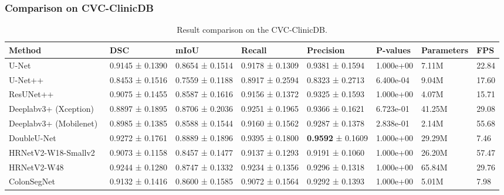 \documentclass[journal,twoside,web]{IEEEtran}
\begin{document}
\subsubsection{Comparison on CVC-ClinicDB}
\begin{table*}[!t]
\centering
\footnotesize
\caption{Result comparison on the CVC-ClinicDB.}
\label{tab:result2}
\begin{tabular}{@{}l|l|l|l|l|l|l|l@{}}
\toprule
\textbf{Method} &\textbf{DSC}   &\textbf{mIoU} &\textbf{Recall} &\textbf{Precision}& \textbf{P-values} & \textbf{Parameters} & \textbf{FPS} \\
\hline
\hline


U-Net~\cite{ronneberger2015u}  & 0.9145 ± 0.1390 & 0.8654 ± 0.1514 &0.9178 ± 0.1309 &0.9381 ± 0.1594 & 1.000e+00 & 7.11M & 22.84    \\ \hline

U-Net++~\cite{zhou2019unet++} & 0.8453 ± 0.1516 & 0.7559 ± 0.1188 & 0.8917 ± 0.2594 & 0.8323 ± 0.2713 & 6.400e-04 & 9.04M & 17.60 \\ \hline

ResUNet++~\cite{jha2019resunet++} & 0.9075 ± 0.1455 & 0.8587 ± 0.1616 & 0.9156 ± 0.1372 & 0.9325 ± 0.1593 & 1.000e+00 & 4.07M & 15.71 \\ \hline

Deeplabv3+ (Xception)~\cite{chen2018encoder} & 0.8897 ± 0.1895 & 0.8706 ± 0.2036 & 0.9251 ± 0.1965 & 0.9366 ± 0.1621 & 6.723e-01 & 41.25M & 29.08 \\\hline

Deeplabv3+ (Mobilenet)~\cite{chen2018encoder} & 0.8985 ± 0.1385 & 0.8588 ± 0.1544 & 0.9160 ± 0.1562 & 0.9287 ± 0.1378 & 2.838e-01 & 2.14M & 55.68 \\ \hline

DoubleU-Net~\cite{jha2020doubleu} & 0.9272 ± 0.1761 & 0.8889 ± 0.1896 & 0.9395 ± 0.1800 & \textbf{0.9592} ± 0.1609 & 1.000e+00 & 29.29M & 7.46 \\ \hline

HRNetV2-W18-Smallv2~\cite{Wang_2020} & 0.9073 ± 0.1158 & 0.8457 ± 0.1477 & 0.9137 ± 0.1293 & 0.9191 ± 0.1060 & 1.000e+00 & 26.20M & 57.47 \\ \hline 

HRNetV2-W48~\cite{Wang_2020} & 0.9244 ± 0.1280 & 0.8747 ± 0.1332 & 0.9234 ± 0.1356 & 0.9296 ± 0.1318 & 1.000e+00 & 65.84M & 29.76 \\ \hline

ColonSegNet~\cite{jha2021real} & 0.9132 ± 0.1416 & 0.8600 ± 0.1585 & 0.9072 ± 0.1564  & 0.9292 ± 0.1393 & 1.000e+00 & 5.01M & 7.98 \\ \hline


\end{tabular}
\end{table*}
\end{document}
